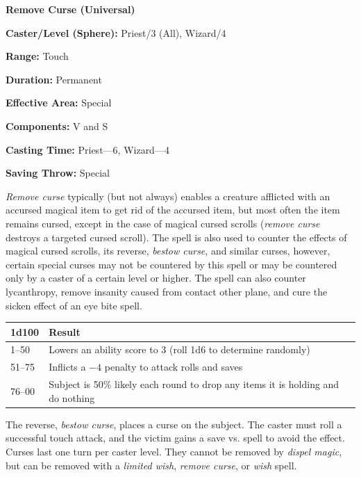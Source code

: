 \begin{multicols}{2}

\vspace{1em}

\noindent
\begin{minipage}{\columnwidth}

\noindent \textbf{Remove Curse (Universal)}

\noindent \textbf{Caster/Level (Sphere):} Priest/3 (All), Wizard/4

\noindent \textbf{Range:} Touch

\noindent \textbf{Duration:} Permanent

\noindent \textbf{Effective Area:} Special

\noindent \textbf{Components:} V and S

\noindent \textbf{Casting Time:} Priest---6, Wizard---4

\noindent \textbf{Saving Throw:} Special

\end{minipage}

\textit{Remove curse} typically (but not always) enables a creature afflicted with an accursed magical item to get rid of the accursed item, but most often the item remains cursed, except in the case of magical cursed scrolls (\textit{remove curse} destroys a targeted cursed scroll).  The spell is also used to counter the effects of magical cursed scrolls, its reverse, \textit{bestow curse}, and similar curses, however, certain special curses may not be countered by this spell or may be countered only by a caster of a certain level or higher.  The spell can also counter lycanthropy, remove insanity caused from contact other plane, and cure the sicken effect of an eye bite spell. 

\noindent
\begin{tabular}{|p{}|p{}|}
\hline
1d100	& Result \\
\hline\hline
\rowcolor[gray]{0.9}1--50	& Lowers an ability score to 3 (roll 1d6 to determine randomly) \\
51--75	& Inflicts a $-4$ penalty to attack rolls and saves \\
\rowcolor[gray]{0.9}76--00	& Subject is 50\% likely each round to drop any items it is holding and do nothing \\
\hline
\end{tabular}

The reverse, \textit{bestow curse}, places a curse on the subject.  The caster must roll a successful touch attack, and the victim gains a save vs. spell to avoid the effect.  Curses last one turn per caster level.  They cannot be removed by \textit{dispel magic}, but can be removed with a \textit{limited wish}, \textit{remove curse}, or \textit{wish} spell.


\end{multicols}
